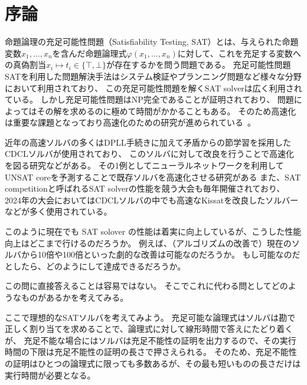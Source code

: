 \section{序論}
命題論理の充足可能性問題（Satisfiability Testing, SAT）とは、与えられた命題変数\( x_1,\dots,x_n \)を含んだ命題論理式\( \varphi(x_1,\dots,x_n) \)に対して、これを充足する変数への真偽割当\( x_i \mapsto t_i \in \{ \top, \bot \} \)が存在するかを問う問題である。
充足可能性問題SATを利用した問題解決手法はシステム検証やプランニング問題など様々な分野において利用されており、
この充足可能性問題を解くSAT solverは広く利用されている。
しかし充足可能性問題はNP完全であることが証明されており、
問題によってはその解を求めるのに極めて時間がかかることもある。
そのため高速化は重要な課題となっており高速化のための研究が進められている~\cite{solover1,solover2,solver3,MINISAT,kissat,neuralnet-vs-random-VSIDS}。

近年の高速ソルバの多くはDPLL手続きに加えて矛盾からの節学習を採用したCDCLソルバが使用されており、
このソルバに対して改良を行うことで高速化を図る研究などがある。
その1例としてニューラルネットワークを利用してUNSAT coreを予測することで既存ソルバを高速化させる研究がある
また、SAT competitionと呼ばれるSAT solverの性能を競う大会も毎年開催されており、
2024年の大会においてはCDCLソルバの中でも高速なKissatを改良したソルバーなどが多く使用されている。%

このように現在でも SAT solover の性能は着実に向上しているが、こうした性能向上はどこまで行けるのだろうか。
例えば、（アルゴリズムの改善で）現在のソルバから10倍や100倍といった劇的な改善は可能なのだろうか。
もし可能なのだとしたら、どのようにして達成できるだろうか。



この問に直接答えることは容易ではない。
そこでこれに代わる問としてどのようなものがあるかを考えてみる。

ここで理想的なSATソルバを考えてみよう。
充足可能な論理式はソルバは勘で正しく割り当てを求めることで、論理式に対して線形時間で答えにたどり着くが、
充足不能な場合にはソルバは充足不能性の証明を出力するので、その実行時間の下限は充足不能性の証明の長さで押さえられる。
そのため、充足不能性の証明はひとつの論理式に限っても多数あるが、その最も短いものの長さだけは実行時間が必要となる。

